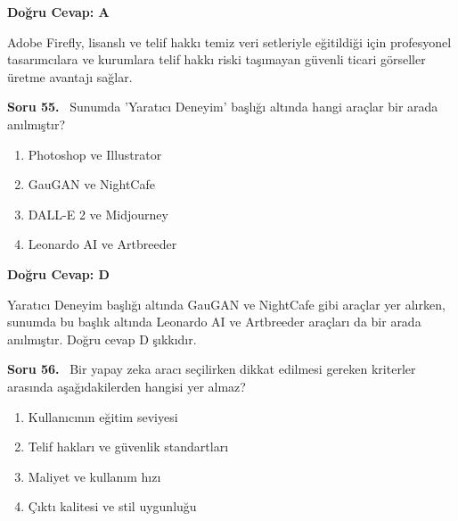 \documentclass[11pt,a4paper,openany]{book}
\begin{document}
\vspace{4pt}
\begin{tcolorbox}[title=Cevap ve Açıklama, colback=gray!3!white, colframe=primarycolor!90!black, arc=2mm, fonttitle=\bfseries\sffamily, top=6pt, bottom=6pt]
    \textbf{Doğru Cevap: A}

    \vspace{2pt}
    Adobe Firefly, lisanslı ve telif hakkı temiz veri setleriyle eğitildiği için profesyonel tasarımcılara ve kurumlara telif hakkı riski taşımayan güvenli ticari görseller üretme avantajı sağlar.
\end{tcolorbox}
\vspace{10pt}
\needspace{5cm}
\vspace{8pt}
\noindent\textbf{\large\sffamily Soru 55.} \ Sunumda 'Yaratıcı Deneyim' başlığı altında hangi araçlar bir arada anılmıştır?

\begin{enumerate}[label=\Alph*), leftmargin=25pt, topsep=4pt, itemsep=2pt]
        \item Photoshop ve Illustrator
        \item GauGAN ve NightCafe
        \item DALL-E 2 ve Midjourney
        \item Leonardo AI ve Artbreeder
\end{enumerate}

\vspace{4pt}
\begin{tcolorbox}[title=Cevap ve Açıklama, colback=gray!3!white, colframe=primarycolor!90!black, arc=2mm, fonttitle=\bfseries\sffamily, top=6pt, bottom=6pt]
    \textbf{Doğru Cevap: D}

    \vspace{2pt}
    Yaratıcı Deneyim başlığı altında GauGAN ve NightCafe gibi araçlar yer alırken, sunumda bu başlık altında Leonardo AI ve Artbreeder araçları da bir arada anılmıştır. Doğru cevap D şıkkıdır.
\end{tcolorbox}
\vspace{10pt}
\needspace{5cm}
\vspace{8pt}
\noindent\textbf{\large\sffamily Soru 56.} \ Bir yapay zeka aracı seçilirken dikkat edilmesi gereken kriterler arasında aşağıdakilerden hangisi yer almaz?

\begin{enumerate}[label=\Alph*), leftmargin=25pt, topsep=4pt, itemsep=2pt]
        \item Kullanıcının eğitim seviyesi
        \item Telif hakları ve güvenlik standartları
        \item Maliyet ve kullanım hızı
        \item Çıktı kalitesi ve stil uygunluğu
\end{enumerate}
\end{document}
